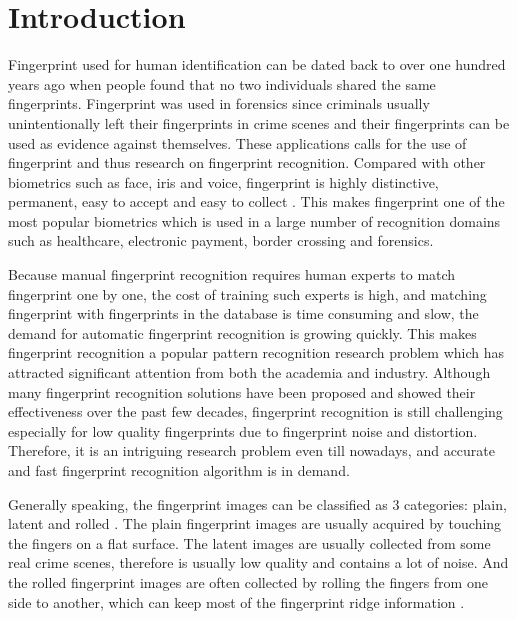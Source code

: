 \section{Introduction}
Fingerprint used for human identification can be dated back to over one hundred years ago when people found that no two individuals shared the same fingerprints. Fingerprint was used in forensics since criminals usually unintentionally left their fingerprints in crime scenes and their fingerprints can be used as evidence against themselves. These applications calls for the use of fingerprint and thus research on fingerprint recognition. Compared with other biometrics such as face, iris and voice, fingerprint is highly distinctive, permanent, easy to accept and easy to collect \cite{Maltoni2009}. This makes fingerprint one of the most popular biometrics which is used in a large number of recognition domains such as healthcare, electronic payment, border crossing and forensics.

Because manual fingerprint recognition requires human experts to match fingerprint one by one, the cost of training such experts is high, and matching fingerprint with fingerprints in the database is time consuming and slow, the demand for automatic fingerprint recognition is growing quickly. This makes fingerprint recognition a popular pattern recognition research problem which has attracted significant attention from both the academia and industry. Although many fingerprint recognition solutions have been proposed and showed their effectiveness over the past few decades, fingerprint recognition is still challenging especially for low quality fingerprints due to fingerprint noise and distortion. Therefore, it is an intriguing  research problem even till nowadays, and accurate and fast fingerprint recognition algorithm is in demand.

Generally speaking, the fingerprint images can be classified as 3 categories: plain, latent and rolled \cite{nimkarFingerprintSegmentationAlgorithms2014}.
The plain fingerprint images are usually acquired by touching the fingers on a flat surface.
The latent images are usually collected from some real crime scenes, therefore is usually low quality and contains a lot of noise.
And the rolled fingerprint images are often collected by rolling the fingers from one side to another, which can keep most of the fingerprint ridge information \cite{nimkarFingerprintSegmentationAlgorithms2014}.

